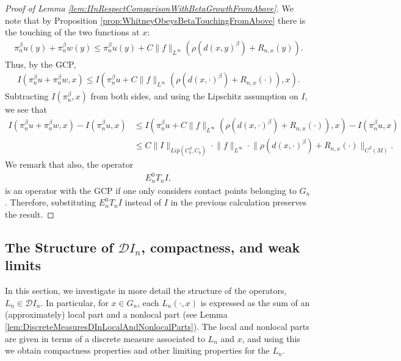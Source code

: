 \documentclass[11pt,reqno]{amsart}
\numberwithin{equation}{section}
\theoremstyle{plain}
\def\D{\mathcal D}
\newcommand{\norm}[1]{\lVert#1\rVert}
\begin{document}
\begin{proof}[Proof of Lemma \ref{lem:IInRespectComparisonWithBetaGrowthFromAbove}]
	We note that by Proposition \ref{prop:WhitneyObeysBetaTouchingFromAbove}  there is the touching of the two functions at $x$:
	\begin{align*}
		\pi_n^\beta u(y) + \pi_n^\beta w(y) 
		\leq \pi_n^\beta u(y) + C\norm{f}_{L^\infty}(\rho(d(x,y)^\beta)+R_{n,x}(y)).
	\end{align*}
	Thus, by the GCP,
	\begin{align*}
		I(\pi_n^\beta u + \pi_n^\beta w, x) 
		\leq I(\pi_n^\beta u + C\norm{f}_{L^\infty}(\rho(d(x,\cdot)^\beta)+R_{n,x}(\cdot)), x).
	\end{align*}
	Subtracting $I(\pi_n^\beta,x)$ from both sides, and using the Lipschitz assumption on $I$, we see that
	\begin{align*}
		I(\pi_n^\beta u + \pi_n^\beta w, x) - I(\pi_n^\beta u, x) &\leq I(\pi_n^\beta u + C\norm{f}_{L^\infty}(\rho(d(x,\cdot)^\beta)+R_{n,x}(\cdot)), x) - 
		I(\pi_n^\beta u, x)\\
		&\leq C\norm{I}_{Lip(C^\beta_b,C_b)}\cdot \norm{f}_{L^\infty}
		\cdot \norm{\rho(d(x,\cdot)^\beta)+R_{n,x}(\cdot)}_{C^\beta(M)}.
	\end{align*}
	We remark that also, the operator
	\begin{align*}
		E_n^0 T_n I,
	\end{align*}
	is an operator with the GCP if one only considers contact points belonging to $G_n$.  Therefore, substituting $E_n^0 T_n I$ instead of $I$ in the previous calculation preserves the result.
\end{proof}






\subsection{The Structure of $\D I_n$, compactness, and weak limits}\label{sec:StructureOfDIn}

In this section, we investigate in more detail the structure of the operators, $L_n\in \D I_n$.  In particular, for $x\in G_n$, each $L_n(\cdot,x)$ is expressed as the sum of an (approximately) local part and a nonlocal part (see Lemma \ref{lem:DiscreteMeasuresDInLocalAndNonlocalParts}).  The local and nonlocal parts are given in terms of a discrete measure associated to $L_n$ and $x$, and using this we obtain compactness properties and other limiting properties for the $L_n$.
\end{document}
